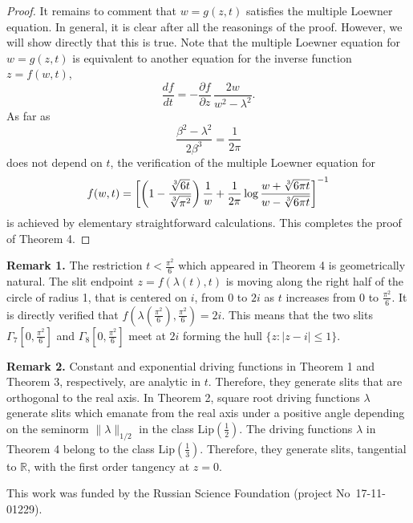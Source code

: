 \documentclass[
11pt,%
tightenlines,%
twoside,%
onecolumn,%
nofloats,%
nobibnotes,%
nofootinbib,%
superscriptaddress,%
noshowpacs,%
centertags]%
{revtex4}
\begin{document}
\begin{proof}
It remains to comment that $w=g(z,t)$ satisfies the multiple Loewner equation. In general, it is clear after all the reasonings of the proof. However, we will show directly that this is true. Note that the multiple Loewner equation for $w=g(z,t)$ is equivalent to another equation for the inverse function $z=f(w,t)$, $$\frac{df}{dt}=-\frac{\partial f}{\partial z}\,\frac{2w}{w^2-\lambda^2}.$$ As far as $$\frac{\beta^2-\lambda^2}{2\beta^3}=\frac{1}{2\pi}$$ does not depend on $t$, the verification of the multiple Loewner equation for $$f(w,t)=\left[\left(1-\frac{\root3\of{6t}}{\root3\of{\pi^2}}\right)\frac{1}{w}+\frac{1}{2\pi}\log\frac{w+\root3\of{6\pi t}}{w-\root3\of{6\pi t}}\right]^{-1}$$ is achieved by elementary straightforward calculations. This completes the proof of Theorem 4.
\end{proof}

{\bf Remark 1.} The restriction $t<\frac{\pi^2}{6}$ which appeared in Theorem 4 is geometrically natural. The slit endpoint $z=f(\lambda(t),t)$ is moving along the right half of the circle of radius 1, that is centered on $i$, from 0 to $2i$ as $t$ increases from 0 to $\frac{\pi^2}{6}$. It is directly verified that $f(\lambda(\frac{\pi^2}{6}),\frac{\pi^2}{6})=2i$. This means that the two slits $\Gamma_7[0,\frac{\pi^2}{6}]$ and $\Gamma_8[0,\frac{\pi^2}{6}]$ meet at $2i$ forming the hull $\{z:|z-i|\leq1\}$. \vskip2mm

{\bf Remark 2.} Constant and exponential driving functions in Theorem 1 and Theorem 3, respectively, are analytic in $t$. Therefore, they generate slits that are orthogonal to the real axis. In Theorem 2, square root driving functions $\lambda$ generate slits which emanate from the real axis under a positive angle depending on the seminorm $\|\lambda\|_{1/2}$ in the class $\text{Lip}(\frac{1}{2})$. The driving functions $\lambda$ in Theorem 4 belong to the class $\text{Lip}(\frac{1}{3})$. Therefore, they generate slits, tangential to $\mathbb R$, with the first order tangency at $z=0$.

\begin{acknowledgments}
This work was funded by the Russian Science Foundation (project No~17-11-01229).
\end{acknowledgments}
\end{document}
